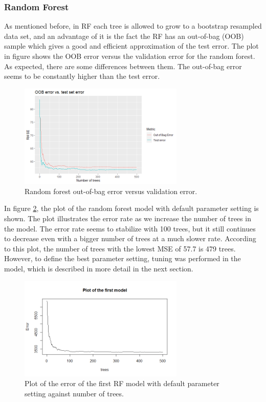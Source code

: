\documentclass{usiinftr}
\begin{document}
\subsubsection{Random Forest}
As mentioned before, in RF each tree is allowed to grow to a bootstrap resampled data set, and an advantage of it is the fact the RF has an out-of-bag (OOB) sample which gives a good and efficient approximation of the test error. The plot in figure \label{RFOOB} shows the OOB error versus the validation error for the random forest. As expected, there are some differences between them. The out-of-bag error seems to be constantly higher than the test error. 

\begin{figure}[h!] 
\centering
\includegraphics[width=0.7\textwidth]{images/image125.png}
\caption{Random forest out-of-bag error versus validation error.}
\label{RFOOB}
\end{figure}

In figure \ref{RFtrees}, the plot of the random forest model with default parameter setting is shown. The plot illustrates the error rate as we increase the number of trees in the model. The error rate seems to stabilize with 100 trees, but it still continues to decrease even with a bigger number of trees at a much slower rate. According to this plot, the number of trees with the lowest MSE of 57.7 is 479 trees. However, to define the best parameter setting, tuning was performed in the model, which is described in more detail in the next section. 

\begin{figure}[h!] 
\centering
\includegraphics[width=0.7\textwidth]{images/image118.png}
\caption{Plot of the error of the first RF model with default parameter setting against number of trees.}
\label{RFtrees}
\end{figure}
\end{document}
